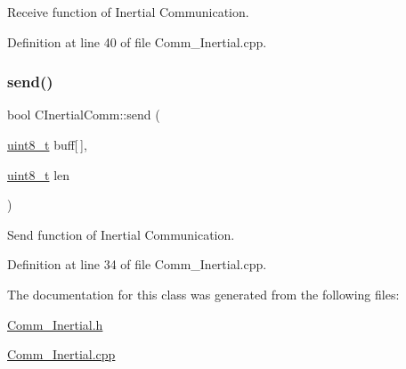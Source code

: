 Receive function of Inertial Communication. 



Definition at line 40 of file Comm\+\_\+\+Inertial.\+cpp.

\mbox{\label{class_c_inertial_comm_ad40aa8ed083373c27fdc1aa11dfc319e}} 
\subsubsection{\texorpdfstring{send()}{send()}}
{\footnotesize\ttfamily bool C\+Inertial\+Comm\+::send (\begin{DoxyParamCaption}\item[{\mbox{\hyperlink{_a_d_a_s___types_8h_aba7bc1797add20fe3efdf37ced1182c5}{uint8\+\_\+t}}}]{buff\mbox{[}$\,$\mbox{]},  }\item[{\mbox{\hyperlink{_a_d_a_s___types_8h_aba7bc1797add20fe3efdf37ced1182c5}{uint8\+\_\+t}}}]{len }\end{DoxyParamCaption})}



Send function of Inertial Communication. 



Definition at line 34 of file Comm\+\_\+\+Inertial.\+cpp.



The documentation for this class was generated from the following files\+:\begin{DoxyCompactItemize}
\item 
\mbox{\hyperlink{_comm___inertial_8h}{Comm\+\_\+\+Inertial.\+h}}\item 
\mbox{\hyperlink{_comm___inertial_8cpp}{Comm\+\_\+\+Inertial.\+cpp}}\end{DoxyCompactItemize}
